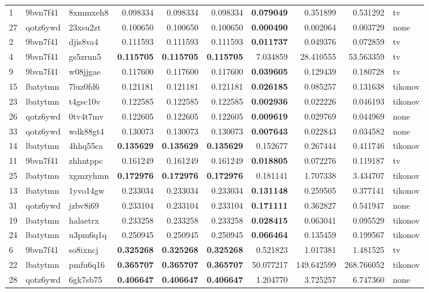 \documentclass[nomenclature, english, bibtex]{kththesis}
\numberwithin{listing}{chapter}
\begin{document}
\begin{tabular}{lllrrrrrrl}
1 & 9bvn7f41 & 8xmmxeh8 & 0.098334 & 0.098334 & 0.098334 & \bfseries 0.079049 & 0.351899 & 0.531292 & tv \\
27 & qotz6ywd & 23xsu2zt & 0.100650 & 0.100650 & 0.100650 & \bfseries 0.000490 & 0.002064 & 0.003729 & none \\
2 & 9bvn7f41 & djis8va4 & 0.111593 & 0.111593 & 0.111593 & \bfseries 0.011737 & 0.049376 & 0.072859 & tv \\
4 & 9bvn7f41 & gs5zrun5 & \bfseries 0.115705 & \bfseries 0.115705 & \bfseries 0.115705 & 7.034859 & 28.410555 & 53.563359 & tv \\
9 & 9bvn7f41 & w08jjgae & 0.117600 & 0.117600 & 0.117600 & \bfseries 0.039605 & 0.129439 & 0.180728 & tv \\
15 & lbatytmn & 7luz0fd6 & 0.121181 & 0.121181 & 0.121181 & \bfseries 0.026185 & 0.085257 & 0.131638 & tikonov \\
23 & lbatytmn & t4gsc10v & 0.122585 & 0.122585 & 0.122585 & \bfseries 0.002936 & 0.022226 & 0.046193 & tikonov \\
26 & qotz6ywd & 0tv4t7mv & 0.122605 & 0.122605 & 0.122605 & \bfseries 0.009619 & 0.029769 & 0.044969 & none \\
33 & qotz6ywd & wdk88gt4 & 0.130073 & 0.130073 & 0.130073 & \bfseries 0.007643 & 0.022843 & 0.034582 & none \\
14 & lbatytmn & 4hhq55ca & \bfseries 0.135629 & \bfseries 0.135629 & \bfseries 0.135629 & 0.152677 & 0.267444 & 0.411746 & tikonov \\
11 & 9bvn7f41 & zhhntppc & 0.161249 & 0.161249 & 0.161249 & \bfseries 0.018805 & 0.072276 & 0.119187 & tv \\
25 & lbatytmn & xgmzyhmn & \bfseries 0.172976 & \bfseries 0.172976 & \bfseries 0.172976 & 0.181141 & 1.707338 & 3.434707 & tikonov \\
13 & lbatytmn & 1yvo14gw & 0.233034 & 0.233034 & 0.233034 & \bfseries 0.131148 & 0.259505 & 0.377141 & tikonov \\
31 & qotz6ywd & jzbv8i69 & 0.233104 & 0.233104 & 0.233104 & \bfseries 0.171111 & 0.362827 & 0.541947 & none \\
19 & lbatytmn & halaetrx & 0.233258 & 0.233258 & 0.233258 & \bfseries 0.028415 & 0.063041 & 0.095529 & tikonov \\
24 & lbatytmn & u3pm6q1q & 0.250945 & 0.250945 & 0.250945 & \bfseries 0.066464 & 0.135459 & 0.199567 & tikonov \\
6 & 9bvn7f41 & so8ixncj & \bfseries 0.325268 & \bfseries 0.325268 & \bfseries 0.325268 & 0.521823 & 1.017381 & 1.481525 & tv \\
22 & lbatytmn & pmfu6q16 & \bfseries 0.365707 & \bfseries 0.365707 & \bfseries 0.365707 & 50.077217 & 149.642599 & 268.766052 & tikonov \\
28 & qotz6ywd & 6gk7sb75 & \bfseries 0.406647 & \bfseries 0.406647 & \bfseries 0.406647 & 1.204770 & 3.725257 & 6.747360 & none \\
\end{tabular}
\end{document}
